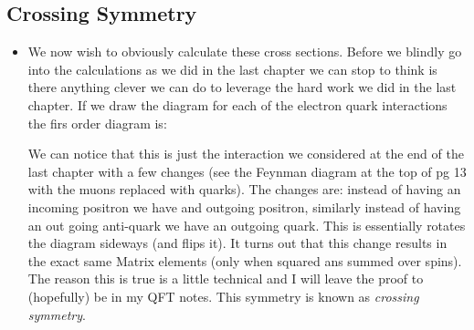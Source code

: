 \documentclass[11pt]{article}
\numberwithin{equation}{section}
\begin{document}
\subsection{Crossing Symmetry} %
\label{sub:crossing_symmetry}
\begin{itemize}
    \item We now wish to obviously calculate these cross sections. Before we blindly go into the calculations as we did in the last chapter we can stop to think is there anything clever we can do to leverage the hard work we did in the last chapter. If we draw the diagram for each of the electron quark interactions the firs order diagram is:  
    \begin{figure}[H]
\centering
{}
\end{figure}
We can notice that this is just the interaction we considered at the end of the last chapter with a few changes (see the Feynman diagram at the top of pg 13 with the muons replaced with quarks). The changes are: instead of having an incoming positron we have and outgoing positron, similarly instead of having an out going anti-quark we have an outgoing quark. This is essentially rotates the diagram sideways (and flips it). It turns out that this change results in the exact same Matrix elements (only when squared ans summed over spins). The reason this is true is a little technical and I will leave the proof to (hopefully) be in my QFT notes. This symmetry is known as \emph{crossing symmetry}. 


\end{itemize}
\end{document}
